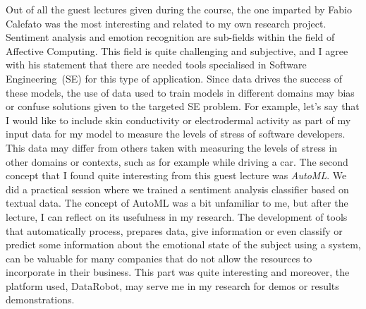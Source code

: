 \documentclass[11pt]{article}
\begin{document}
Out of all the guest lectures given during the course, the one imparted by Fabio Calefato was the most interesting and related to my own research project. Sentiment analysis and emotion recognition are sub-fields within the field of Affective Computing. This field is quite challenging and subjective, and I agree with his statement that there are needed tools specialised in Software Engineering~(SE) for this type of application. Since data drives the success of these models, the use of data used to train models in different domains may bias or confuse solutions given to the targeted SE problem. For example, let's say that I would like to include skin conductivity or electrodermal activity as part of my input data for my model to measure the levels of stress of software developers. This data may differ from others taken with measuring the levels of stress in other domains or contexts, such as for example while driving a car. 
The second concept that I found quite interesting from this guest lecture was \textit{AutoML}. We did a practical session where we trained a sentiment analysis classifier based on textual data. The concept of AutoML was a bit unfamiliar to me, but after the lecture, I can reflect on its usefulness in my research. The development of tools that automatically process, prepares data, give information or even classify or predict some information about the emotional state of the subject using a system, can be valuable for many companies that do not allow the resources to incorporate in their business. This part was quite interesting and moreover, the platform used, DataRobot, may serve me in my research for demos or results demonstrations. 
\end{document}
